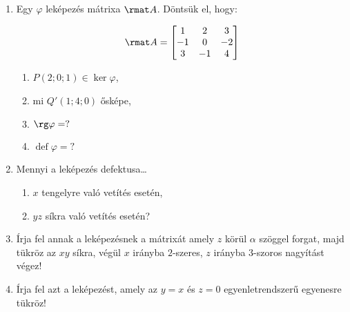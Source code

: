 \documentclass[a4paper, 12pt]{scrartcl}
\begin{document}
\begin{enumerate}
  \item Egy $\varphi$ leképezés mátrixa $\rmat A$. Döntsük el, hogy:\\[-2mm]
        \begin{minipage}[b]{.25\textwidth}
          $$
            \rmat A = \begin{bmatrix}
              1  & 2  & 3  \\
              -1 & 0  & -2 \\
              3  & -1 & 4  \\
            \end{bmatrix}
          $$
        \end{minipage}\hfill
        \begin{minipage}[c]{.35\textwidth}
          \begin{enumerate}
            \item $P(2; 0; 1) \in \ker \varphi$,
            \item mi $Q'(1; 4; 0)$ ősképe,
          \end{enumerate}
        \end{minipage}
        \begin{minipage}[c]{.3\textwidth}
          \begin{enumerate}
            \setcounter{enumii}{2}
            \item $\rg \varphi = ?$
            \item $\operatorname{def} \varphi = ?$
          \end{enumerate}
        \end{minipage}

  \item Mennyi a leképezés defektusa\dots
        \begin{multicols}{2}
          \begin{enumerate}
            \item $x$ tengelyre való vetítés esetén,
            \item $yz$ síkra való vetítés esetén?
          \end{enumerate}
        \end{multicols}

  \item Írja fel annak a leképezésnek a mátrixát amely $z$ körül $\alpha$
        szöggel forgat, majd tükröz az $xy$ síkra, végül $x$ irányba $2$-szeres,
        $z$ irányba $3$-szoros nagyítást végez!

  \item Írja fel azt a leképezést, amely az $y=x$ és $z=0$ egyenletrendszerű
        egyenesre tükröz!


\end{enumerate}
\end{document}
